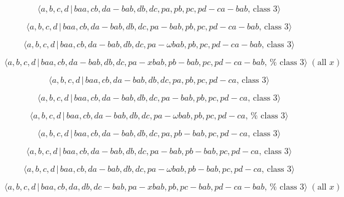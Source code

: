 \documentclass[10pt]{article}
\begin{document}
\begin{equation}
\langle a,b,c,d\,|\,baa,cb,da-bab,db,dc,pa,pb,pc,pd-ca-bab,\,\text{class }%
3\rangle  \tag{7.4012}
\end{equation}

\begin{equation}
\langle a,b,c,d\,|\,baa,cb,da-bab,db,dc,pa-bab,pb,pc,pd-ca-bab,\,\text{class 
}3\rangle  \tag{7.4013}
\end{equation}

\begin{equation}
\langle a,b,c,d\,|\,baa,cb,da-bab,db,dc,pa-\omega bab,pb,pc,pd-ca-bab,\,%
\text{class }3\rangle  \tag{7.4014}
\end{equation}

\begin{equation}
\langle a,b,c,d\,|\,baa,cb,da-bab,db,dc,pa-xbab,pb-bab,pc,pd-ca-bab,\,\text{%
class }3\rangle \;(\text{all }x)  \tag{7.4015}
\end{equation}

\begin{equation}
\langle a,b,c,d\,|\,baa,cb,da-bab,db,dc,pa,pb,pc,pd-ca,\,\text{class }%
3\rangle  \tag{7.4016}
\end{equation}

\begin{equation}
\langle a,b,c,d\,|\,baa,cb,da-bab,db,dc,pa-bab,pb,pc,pd-ca,\,\text{class }%
3\rangle  \tag{7.4017}
\end{equation}

\begin{equation}
\langle a,b,c,d\,|\,baa,cb,da-bab,db,dc,pa-\omega bab,pb,pc,pd-ca,\,\text{%
class }3\rangle  \tag{7.4018}
\end{equation}

\begin{equation}
\langle a,b,c,d\,|\,baa,cb,da-bab,db,dc,pa,pb-bab,pc,pd-ca,\,\text{class }%
3\rangle  \tag{7.4019}
\end{equation}

\begin{equation}
\langle a,b,c,d\,|\,baa,cb,da-bab,db,dc,pa-bab,pb-bab,pc,pd-ca,\,\text{class 
}3\rangle  \tag{7.4020}
\end{equation}

\begin{equation}
\langle a,b,c,d\,|\,baa,cb,da-bab,db,dc,pa-\omega bab,pb-bab,pc,pd-ca,\,%
\text{class }3\rangle  \tag{7.4021}
\end{equation}

\begin{equation}
\langle a,b,c,d\,|\,baa,cb,da,db,dc-bab,pa-xbab,pb,pc-bab,pd-ca-bab,\,\text{%
class }3\rangle \;(\text{all }x)  \tag{7.4022}
\end{equation}
\end{document}
